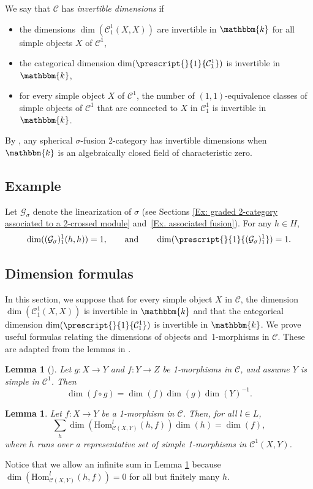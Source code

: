 \documentclass[a4paper, oneside]{amsart}
\numberwithin{equation}{subsection}
\theoremstyle{referencedlemma}
\newtheorem{lemref}[equation]{Lemma}
\theoremstyle{plain} %
\newtheorem{lem}[equation]{Lemma}
\theoremstyle{remark}
\begin{document}
We say that $\mathcal{C}$ has \emph{invertible dimensions} if
\begin{itemize}
\item the dimensions $\dim({\mathcal{C}_1^1}(X,X))$ are invertible in $\mathbbm{k}$ for all simple objects $X$ of $\mathcal{C}^1$,
\item the categorical dimension $\dim(\prescript{}{1}{\mathcal{C}_1^1})$ is invertible in $\mathbbm{k}$,
\item for every simple object $X$ of $\mathcal{C}^1$, the number of $(1,1)$-equivalence classes of simple objects of $\mathcal{C}^1$ that are connected to $X$ in $\mathcal{C}_1^1$ is invertible in $\mathbbm{k}$.
\end{itemize}
By \cite[Theorem 2.3]{etingofFusionCategories2005},  any spherical $\sigma$-fusion 2-category has invertible dimensions when $\mathbbm{k}$ is an algebraically closed field of characteristic zero.

\subsection{Example} Let $\mathcal{G}_\sigma$ denote the linearization of $\sigma$ (see Sections \ref{Ex: graded 2-category associated to a 2-crossed module} and~\ref{Ex. associated fusion}).  For any $h\in H$, 
$$
\dim((\mathcal{G}_\sigma)_1^1(h,h)) = 1, \quad\quad  \text{and}\quad\quad\dim(\prescript{}{1}{(\mathcal{G}_\sigma)_1^1}) = 1.
$$

\subsection{Dimension formulas}\label{Section_Dimension_formulas} In this section, we suppose that for every simple object $X$ in $\mathcal{C}$, the dimension $\dim(\mathcal{C}_1^1(X,X))$ is invertible in $\mathbbm{k}$ and that the categorical dimension $\dim(\prescript{}{1}{\mathcal{C}_1^1})$ is invertible in $\mathbbm{k}$.  We prove useful formulas relating the dimensions of objects and~1-morphisms in $\mathcal{C}$.  These are adapted from the lemmas in \cite[Appendix B]{douglas_fusion_2018}. 

\begin{lemref}[\cite{douglas_fusion_2018}]\label{Lemma_B1}
Let $g\colon X\to Y$ and $f\colon Y \to Z$ be 1-morphisms in $\mathcal{C}$, and assume $Y$ is simple in $\mathcal{C}^1$. Then
$$
\dim(f\circ g) = \dim(f)\dim(g)\dim(Y)^{-1}.
$$
\end{lemref}

\begin{lem}\label{Lemma_B2}
Let $f\colon X\to Y$ be a 1-morphism in $\mathcal{C}$. Then, for all $l\in L$,
$$
\sum_{h} \dim(\mathrm{Hom}_{\mathcal{C}(X,Y)}^l(h,f))\dim(h) = \dim(f),
$$
where $h$ runs over a representative set of simple 1-morphisms in $\mathcal{C}^1(X,Y)$. 
\end{lem}
Notice that we allow an infinite sum in Lemma \ref{Lemma_B2} because $\dim(\mathrm{Hom}_{\mathcal{C}(X,Y)}^l(h,f))= 0$ for all but finitely many $h$. 
\end{document}
